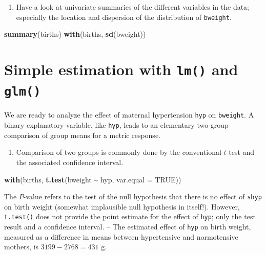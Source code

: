 \documentclass[
]{book}
\newenvironment{Shaded}{\begin{snugshade}}{\end{snugshade}}
\newcommand{\AttributeTok}[1]{\textcolor[rgb]{0.13,0.29,0.53}{#1}}
\newcommand{\ConstantTok}[1]{\textcolor[rgb]{0.56,0.35,0.01}{#1}}
\newcommand{\FunctionTok}[1]{\textcolor[rgb]{0.13,0.29,0.53}{\textbf{#1}}}
\newcommand{\NormalTok}[1]{#1}
\newcommand{\SpecialCharTok}[1]{\textcolor[rgb]{0.81,0.36,0.00}{\textbf{#1}}}
\providecommand{\tightlist}{%
  \setlength{\itemsep}{0pt}\setlength{\parskip}{0pt}}
\begin{document}
\begin{enumerate}
\def\labelenumi{\arabic{enumi}.}
\setcounter{enumi}{2}
\tightlist
\item
  Have a look at univariate summaries of the different
  variables in the data; especially
  the location and dispersion of the distribution of \texttt{bweight}.
\end{enumerate}

\begin{Shaded}
\begin{Highlighting}[]
\FunctionTok{summary}\NormalTok{(births)}
\FunctionTok{with}\NormalTok{(births, }\FunctionTok{sd}\NormalTok{(bweight))}
\end{Highlighting}
\end{Shaded}

\section{\texorpdfstring{Simple estimation with \texttt{lm()} and \texttt{glm()}}{Simple estimation with lm() and glm()}}\label{simple-estimation-with-lm-and-glm}

We are ready to analyze the effect of maternal hypertension \texttt{hyp} on \texttt{bweight}.
A binary explanatory variable, like \texttt{hyp}, leads to an elementary
two-group comparison of group
means for a metric response.

\begin{enumerate}
\def\labelenumi{\arabic{enumi}.}
\tightlist
\item
  Comparison of two groups is commonly done by the conventional \(t\)-test and
  the associated confidence interval.
\end{enumerate}

\begin{Shaded}
\begin{Highlighting}[]
\FunctionTok{with}\NormalTok{(births, }\FunctionTok{t.test}\NormalTok{(bweight }\SpecialCharTok{\textasciitilde{}}\NormalTok{ hyp, }\AttributeTok{var.equal =} \ConstantTok{TRUE}\NormalTok{))}
\end{Highlighting}
\end{Shaded}

The \(P\)-value refers to the test
of the null hypothesis that there is no effect of \texttt{shyp} on birth weight
(somewhat implausible null hypothesis in itself!).
However, \texttt{t.test()} does not provide
the point estimate for the effect of \texttt{hyp}; only the test result and a confidence interval. -- The estimated effect of \texttt{hyp} on birth weight,
measured as a difference in means between hypertensive and normotensive
mothers,
is \(3199-2768 = 431\) g.
\end{document}

